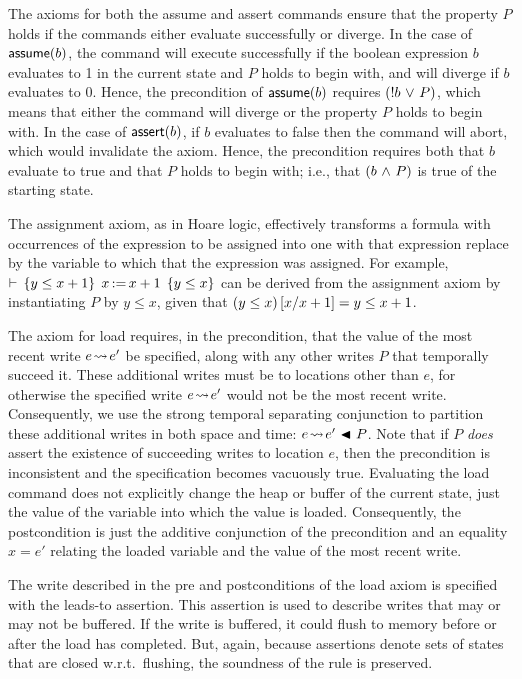\documentclass[11pt]{report}
\begin{document}
The axioms for both the assume and assert commands ensure that the property $P$ holds if the commands either evaluate successfully or diverge. In the case of $\operatorname{\mathsf{assume}}(b)$, the command will execute successfully if the boolean expression $b$ evaluates to 1 in the current state and $P$ holds to begin with, and will diverge if $b$ evaluates to 0. Hence, the precondition of $\operatorname{\mathsf{assume}}(b)$ requires $(!b \operatorname{\,\vee\,} P)$, which means that either the command will diverge or the property $P$ holds to begin with. In the case of $\operatorname{\mathsf{assert}}(b)$, if $b$ evaluates to false then the command will abort, which would invalidate the axiom. Hence, the precondition requires both that $b$ evaluate to true and that $P$ holds to begin with; i.e., that $(b \operatorname{\,\wedge\,} P)$ is true of the starting state. 

The assignment axiom, as in Hoare logic, effectively transforms a formula with occurrences of the expression to be assigned into one with that expression replace by the variable to which that the expression was assigned. For example, $\vdash\,\left\lbrace y \leq x+1 \right\rbrace\;x \operatorname{:\!=} x+1\;\left\lbrace y \leq x \right\rbrace$ can be derived from the assignment axiom by instantiating $P$ by $y \leq x$, given that $(y \leq x)\left[x / x+1\right] = y \leq x+1$. 

The axiom for load requires, in the precondition, that the value of the most recent write $e \!\leadsto\! e'$ be specified, along with any other writes $P$ that temporally succeed it. These additional writes must be to locations other than $e$, for otherwise the specified write $e \!\leadsto\! e'$ would not be the most recent write. Consequently, we use the strong temporal separating conjunction to partition these additional writes in both space and time: $e \!\leadsto\! e' \operatorname{\,\blacktriangleleft\,} P$. Note that if $P$ \emph{does} assert the existence of succeeding writes to location $e$, then the precondition is inconsistent and the specification becomes vacuously true. Evaluating the load command does not explicitly change the heap or buffer of the current state, just the value of the variable into which the value is loaded. Consequently, the postcondition is just the additive conjunction of the precondition and an equality $x = e'$ relating the loaded variable and the value of the most recent write. 

The write described in the pre and postconditions of the load axiom is specified with the leads-to assertion. This assertion is used to describe writes that may or may not be buffered. If the write is buffered, it could flush to memory before or after the load has completed. But, again, because assertions denote sets of states that are closed w.r.t.\ flushing, the soundness of the rule is preserved. 
\end{document}
